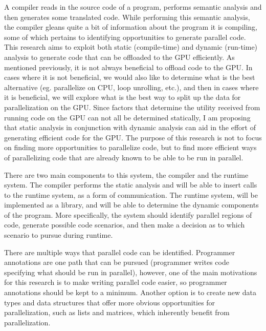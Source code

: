 \documentclass[a4paper,12pt]{article}
\begin{document}
A compiler reads in the source code of a program, performs semantic analysis and then generates some translated code.  While performing this semantic analysis, the compiler gleans quite a bit of information about the program it is compiling, some of which pertains to identifying opportunities to generate parallel code. This research aims to exploit both static (compile-time) and dynamic (run-time) analysis to generate code that can be offloaded to the GPU efficiently.  As mentioned previously, it is not always beneficial to offload code to the GPU.  In cases where it is not beneficial, we would also like to determine what is the best alternative (eg. parallelize on CPU, loop unrolling, etc.), and then in cases where it is beneficial, we will explore what is the best way to split up the data for parallelization on the GPU.  Since factors that determine the utility received from running code on the GPU can not all be determined statically, I am proposing that static analysis in conjunction with dynamic analysis can aid in the effort of generating efficient code for the GPU.  The purpose of this research is not to focus on finding more opportunities to parallelize code, but to find more efficient ways of parallelizing code that are already known to be able to be run in parallel. 

There are two main components to this system, the compiler and the runtime system.  The compiler performs the static analysis and will be able to insert calls to the runtime system, as a form of communication.  The runtime system, will be implemented as a library, and will be able to determine the dynamic components of the program.  More specifically, the system should identify parallel regions of code, generate possible code scenarios, and then make a decision as to which scenario to pursue during runtime.

There are multiple ways that parallel code can be identified.  Programmer annotations are one path that can be pursued (programmer writes code specifying what should be run in parallel), however, one of the main motivations for this research is to make writing parallel code easier, so programmer annotations should be kept to a minimum.  Another option is to create new data types and data structures that offer more obvious opportunities for parallelization, such as lists and matrices, which inherently benefit from parallelization.
\end{document}
